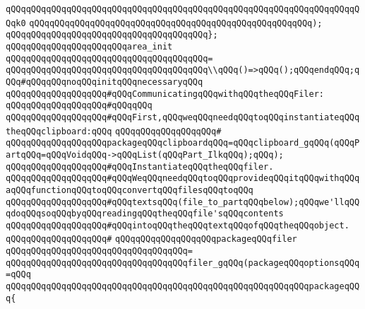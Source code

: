 \verb|qQQqqQQqqQQqqQQqqQQqqQQqqQQqqQQqqQQqqQQqqQQqqQQqqQQqqQQqqQQqqQQqqQQqqQQqk0|\newline
\verb|qQQqqQQqqQQqqQQqqQQqqQQqqQQqqQQqqQQqqQQqqQQqqQQqqQQqqQQq);|\newline
\verb|qQQqqQQqqQQqqQQqqQQqqQQqqQQqqQQqqQQqqQQq};|\newline
\newline
\verb|qQQqqQQqqQQqqQQqqQQqqQQqarea_init|\newline
\verb|qQQqqQQqqQQqqQQqqQQqqQQqqQQqqQQqqQQqqQQq=|\newline
\verb|qQQqqQQqqQQqqQQqqQQqqQQqqQQqqQQqqQQqqQQq\\qQQq()=>qQQq();qQQqendqQQq;qQQq#qQQqqQQqnoqQQqinitqQQqnecessaryqQQq|\newline
\newline
\newline
\verb|qQQqqQQqqQQqqQQqqQQq#qQQqCommunicatingqQQqwithqQQqtheqQQqFiler:|\newline
\verb|qQQqqQQqqQQqqQQqqQQq#qQQqqQQq|\newline
\verb|qQQqqQQqqQQqqQQqqQQq#qQQqFirst,qQQqweqQQqneedqQQqtoqQQqinstantiateqQQqtheqQQqclipboard:qQQq|\newline
\verb|qQQqqQQqqQQqqQQqqQQq#|\newline
\verb|qQQqqQQqqQQqqQQqqQQqpackageqQQqclipboardqQQq=qQQqclipboard_gqQQq(qQQqPartqQQq=qQQqVoidqQQq->qQQqList(qQQqPart_IlkqQQq);qQQq);|\newline
\newline
\verb|qQQqqQQqqQQqqQQqqQQq#qQQqInstantiateqQQqtheqQQqfiler.|\newline
\verb|qQQqqQQqqQQqqQQqqQQq#qQQqWeqQQqneedqQQqtoqQQqprovideqQQqitqQQqwithqQQqaqQQqfunctionqQQqtoqQQqconvertqQQqfilesqQQqtoqQQq|\newline
\verb|qQQqqQQqqQQqqQQqqQQq#qQQqtextsqQQq(file_to_partqQQqbelow);qQQqwe'llqQQqdoqQQqsoqQQqbyqQQqreadingqQQqtheqQQqfile'sqQQqcontents|\newline
\verb|qQQqqQQqqQQqqQQqqQQq#qQQqintoqQQqtheqQQqtextqQQqofqQQqtheqQQqobject.|\newline
\verb|qQQqqQQqqQQqqQQqqQQq#|\newline
\verb|qQQqqQQqqQQqqQQqqQQqpackageqQQqfiler|\newline
\verb|qQQqqQQqqQQqqQQqqQQqqQQqqQQqqQQqqQQq=|\newline
\verb|qQQqqQQqqQQqqQQqqQQqqQQqqQQqqQQqqQQqfiler_gqQQq(packageqQQqoptionsqQQq=qQQq|\newline
\verb|qQQqqQQqqQQqqQQqqQQqqQQqqQQqqQQqqQQqqQQqqQQqqQQqqQQqqQQqqQQqpackageqQQq{|\newline
